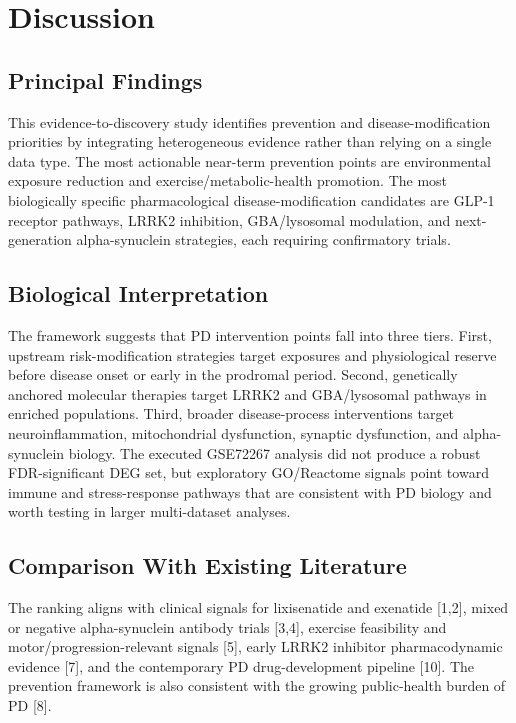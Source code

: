 \documentclass{article}
\begin{document}
\section{Discussion}

\subsection{Principal Findings}

This evidence-to-discovery study identifies prevention and disease-modification priorities by integrating heterogeneous evidence rather than relying on a single data type. The most actionable near-term prevention points are environmental exposure reduction and exercise/metabolic-health promotion. The most biologically specific pharmacological disease-modification candidates are GLP-1 receptor pathways, LRRK2 inhibition, GBA/lysosomal modulation, and next-generation alpha-synuclein strategies, each requiring confirmatory trials.


\subsection{Biological Interpretation}

The framework suggests that PD intervention points fall into three tiers. First, upstream risk-modification strategies target exposures and physiological reserve before disease onset or early in the prodromal period. Second, genetically anchored molecular therapies target LRRK2 and GBA/lysosomal pathways in enriched populations. Third, broader disease-process interventions target neuroinflammation, mitochondrial dysfunction, synaptic dysfunction, and alpha-synuclein biology. The executed GSE72267 analysis did not produce a robust FDR-significant DEG set, but exploratory GO/Reactome signals point toward immune and stress-response pathways that are consistent with PD biology and worth testing in larger multi-dataset analyses.


\subsection{Comparison With Existing Literature}

The ranking aligns with clinical signals for lixisenatide and exenatide [1,2], mixed or negative alpha-synuclein antibody trials [3,4], exercise feasibility and motor/progression-relevant signals [5], early LRRK2 inhibitor pharmacodynamic evidence [7], and the contemporary PD drug-development pipeline [10]. The prevention framework is also consistent with the growing public-health burden of PD [8].
\end{document}
